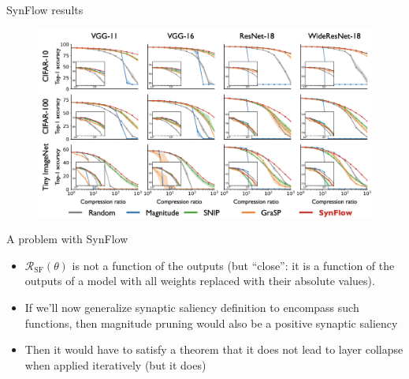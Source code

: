 \documentclass[10pt, handout]{beamer}
\begin{document}
\begin{frame}{SynFlow results}
    \begin{figure}
        \centering
        \includegraphics[width=\textwidth]{images/synflow-results.png}
    \end{figure}
\end{frame}


\begin{frame}{A problem with SynFlow}
    \begin{itemize}
        \pause\item $\mathcal{R}_\text{SF}(\theta)$ is not a function of the outputs (but ``close'': it is a function of the outputs of a model with all weights replaced with their absolute values).
        \pause\item If we'll now generalize synaptic saliency definition to encompass such functions, then magnitude pruning would also be a positive synaptic saliency
        \pause\item Then it would have to satisfy a theorem that it does not lead to layer collapse when applied iteratively (but it does)
    \end{itemize}
\end{frame}


\end{document}
